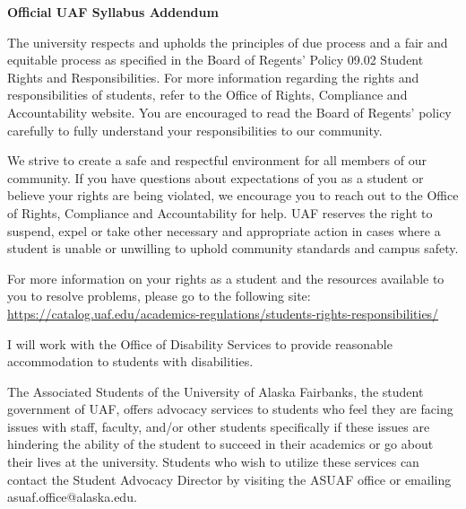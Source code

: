 \documentclass[12pt]{article}
\begin{document}
\begin{center}
\textbf{\large{Official UAF Syllabus Addendum}}
\end{center}


 The university respects and upholds the principles of due process and a fair and equitable process as specified in the Board of Regents' Policy 09.02 Student Rights and Responsibilities. For more information regarding the rights and responsibilities of students, refer to the Office of Rights, Compliance and Accountability website. You are encouraged to read the Board of Regents' policy carefully to fully understand your responsibilities to our community.

We strive to create a safe and respectful environment for all members of our community. If you have questions about expectations of you as a student or believe your rights are being violated, we encourage you to reach out to the  Office of Rights, Compliance and Accountability for help. UAF reserves the right to suspend, expel or take other necessary and appropriate action in cases where a student is unable or unwilling to uphold community standards and campus safety.

For more information on your rights as a student and the resources available to you to resolve problems, please go to the following site:\\ \url{https://catalog.uaf.edu/academics-regulations/students-rights-responsibilities/}

 I will work with the Office of Disability Services to provide reasonable accommodation to students with disabilities.

 The Associated Students of the University of Alaska Fairbanks, the student government of UAF, offers advocacy services to students who feel they are facing issues with staff, faculty, and/or other students specifically if these issues are hindering the ability of the student to succeed in their academics or go about their lives at the university. Students who wish to utilize these services can contact the Student Advocacy Director by visiting the ASUAF office or emailing asuaf.office@alaska.edu. 
\end{document}
